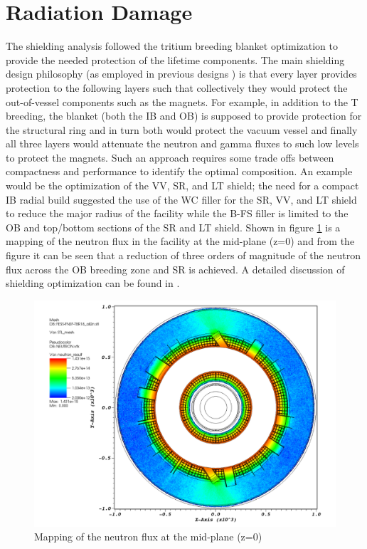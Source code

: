 \documentclass[12pt, letterpaper]{elsarticle}
\begin{document}
\section{Radiation Damage} \label{Radiation Damage}
The shielding analysis followed the tritium breeding blanket optimization to provide the needed protection of the lifetime components. The main shielding design philosophy (as employed in previous designs \cite{ref_13}) is that every layer provides protection to the following layers such that collectively they would protect the out-of-vessel components such as the magnets. For example, in addition to the T breeding, the blanket (both the IB and OB) is supposed to provide protection for the structural ring and in turn both would protect the vacuum vessel and finally all three layers would attenuate the neutron and gamma fluxes to such low levels to protect the magnets. Such an approach requires some trade offs between compactness and performance to identify the optimal composition. An example would be the optimization of the VV, SR, and LT shield; the need for a compact IB radial build suggested the use of the WC filler for the SR, VV, and LT shield to reduce the major radius of the facility while the B-FS filler is limited to the OB and top/bottom sections of the SR and LT shield. Shown in figure \ref{fig:flux mapping} is a mapping of the neutron flux in the facility at the mid-plane (z=0) and from the figure it can be seen that a reduction of three orders of magnitude of the neutron flux across the OB breeding zone and SR is achieved. A detailed discussion of shielding optimization can be found in \cite{ref_2}. 
\begin{figure}[h!]
	\centering
	\includegraphics[scale=0.4]{../plots/flux.png}
	\caption{Mapping of the neutron flux at the mid-plane (z=0)}
	\label{fig:flux mapping}
\end{figure}
\end{document}
